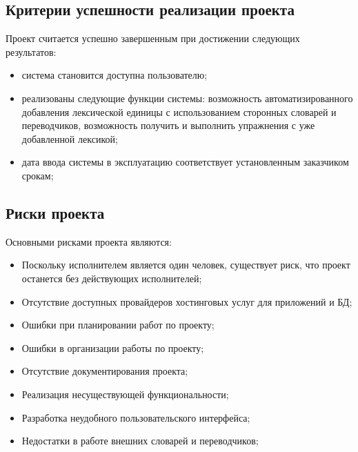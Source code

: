 \documentclass[a4paper,14pt]{extarticle}
\begin{document}
\subsection{Критерии успешности реализации проекта}
Проект считается успешно завершенным при достижении следующих результатов:
\begin{itemize}
    \item система становится доступна пользователю;
    \item реализованы следующие функции системы: возможность автоматизированного
          добавления лексической единицы с использованием сторонных словарей и
          переводчиков, возможность получить и выполнить упражнения с уже
          добавленной лексикой;
    \item дата ввода системы в эксплуатацию соответствует установленным
          заказчиком срокам;
\end{itemize}

\subsection{Риски проекта}
Основными рисками проекта являются:
\begin{itemize}
    \item Поскольку исполнителем является один человек, существует риск, что
          проект останется без действующих исполнителей;
    \item Отсутствие доступных провайдеров хостинговых услуг для приложений и БД;
    \item Ошибки при планировании работ по проекту;
    \item Ошибки в организации работы по проекту;
    \item Отсутствие документирования проекта;
    \item Реализация несуществующей функциональности;
    \item Разработка неудобного пользовательского интерфейса;
    \item Недостатки в работе внешних словарей и переводчиков;
\end{itemize}
\end{document}
